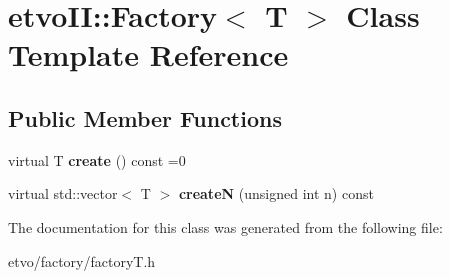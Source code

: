 \hypertarget{classetvo_i_i_1_1_factory}{}\section{etvo\+II\+:\+:Factory$<$ T $>$ Class Template Reference}
\label{classetvo_i_i_1_1_factory}
\subsection*{Public Member Functions}
\begin{DoxyCompactItemize}
\item 
\mbox{\label{classetvo_i_i_1_1_factory_a2361657bfa8883db9c5b2d799afbebec}} 
virtual T {\bfseries create} () const =0
\item 
\mbox{\label{classetvo_i_i_1_1_factory_acb9d9e4a19ea84a356e5e21f1dbf4cf6}} 
virtual std\+::vector$<$ T $>$ {\bfseries createN} (unsigned int n) const
\end{DoxyCompactItemize}


The documentation for this class was generated from the following file\+:\begin{DoxyCompactItemize}
\item 
etvo/factory/factory\+T.\+h\end{DoxyCompactItemize}
